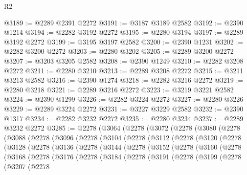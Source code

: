 \begin{lexlean}{R2}
\begin{coremodule}
@3189 := @2289 @2391 @2272
@3191 := @3187 @3189 @2582
@3192 := @2390 @1214
@3194 := @2282 @3192 @2272
@3195 := @2280 @3194
@3197 := @2289 @3192 @2272
@3199 := @3195 @3197 @2582
@3200 := @2390 @1231
@3202 := @2282 @3200 @2272
@3203 := @2280 @3202
@3205 := @2289 @3200 @2272
@3207 := @3203 @3205 @2582
@3208 := @2390 @1249
@3210 := @2282 @3208 @2272
@3211 := @2280 @3210
@3213 := @2289 @3208 @2272
@3215 := @3211 @3213 @2582
@3216 := @2390 @1274
@3218 := @2282 @3216 @2272
@3219 := @2280 @3218
@3221 := @2289 @3216 @2272
@3223 := @3219 @3221 @2582
@3224 := @2390 @1299
@3226 := @2282 @3224 @2272
@3227 := @2280 @3226
@3229 := @2289 @3224 @2272
@3231 := @3227 @3229 @2582
@3232 := @2390 @1317
@3234 := @2282 @3232 @2272
@3235 := @2280 @3234
@3237 := @2289 @3232 @2272
@3285 := @2278
    (@3064
      (@2278
        (@3072
          (@2278
            (@3080
              (@2278
                (@3088
                  (@2278
                    (@3096
                      (@2278
                        (@3104
                          (@2278
                            (@3112
                              (@2278
                                (@3120
                                  (@2278
                                    (@3128
                                      (@2278
                                        (@3136
                                          (@2278
                                            (@3144
                                              (@2278
                                                (@3152
                                                  (@2278
                                                    (@3160
                                                      (@2278
                                                        (@3168
                                                          (@2278
                                                            (@3176
                                                              (@2278
                                                                (@3184
                                                                  (@2278
                                                                    (@3191
                                                                      (@2278
                                                                        (@3199
                                                                          (@2278
                                                                            (@3207
                                                                              (@2278

\end{coremodule}
\end{lexlean}
